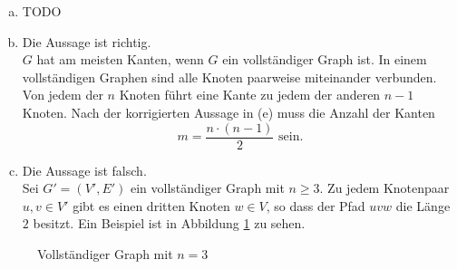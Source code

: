 \documentclass[a4paper]{scrartcl}
\begin{document}
\begin{enumerate}[(a)]
    \item
        TODO

    \item
        Die Aussage ist richtig. \\
        $G$ hat am meisten Kanten, wenn $G$ ein vollständiger Graph ist.
        In einem vollständigen Graphen sind alle Knoten paarweise miteinander
        verbunden.
        Von jedem der $n$ Knoten führt eine Kante zu jedem der anderen $n-1$
        Knoten.
        Nach der korrigierten Aussage in (e) muss die Anzahl der Kanten
        \begin{equation}
            m = \frac{n \cdot (n-1)}{2} \text{ sein.}
        \end{equation}
        

    \item
        Die Aussage ist falsch. \\
        Sei $G' = (V', E')$ ein vollständiger Graph mit $n \geq 3$.
        Zu jedem Knotenpaar $u,v \in V'$ gibt es  einen dritten Knoten
        $w \in V$, so dass der Pfad $uvw$ die Länge $2$ besitzt.
        Ein Beispiel ist in Abbildung \ref{fig:3complete} zu sehen.


\end{enumerate}
\begin{figure}[h]
    \centering
    \caption{Vollständiger Graph mit $n = 3$}
    \label{fig:3complete}
\end{figure}
\end{document}
